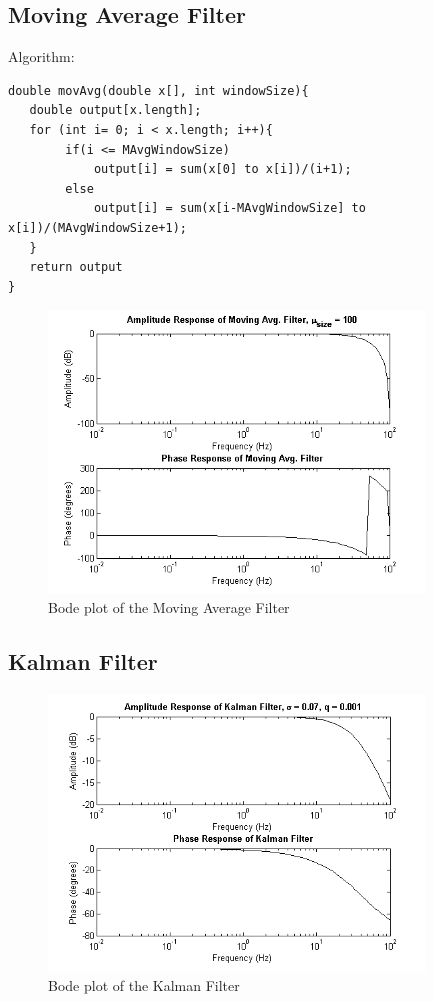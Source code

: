 \documentclass{article}
\theoremstyle{plain}
\theoremstyle{definition}
\theoremstyle{remark}
\begin{document}
\clearpage



\subsection{Moving Average Filter}
Algorithm:
\begin{verbatim}
double movAvg(double x[], int windowSize){
   double output[x.length];   
   for (int i= 0; i < x.length; i++){
        if(i <= MAvgWindowSize)
            output[i] = sum(x[0] to x[i])/(i+1);
        else
            output[i] = sum(x[i-MAvgWindowSize] to x[i])/(MAvgWindowSize+1);
   }
   return output
}
\end{verbatim}

\begin{figure}[hbt]
\begin{center}
\includegraphics[width = 10cm]{bode_MAvgF}
\caption{Bode plot of the Moving Average Filter}
\label{bode_MAvgF}
\end{center}
\end{figure}
 
\clearpage

\subsection{Kalman Filter}

\begin{figure}[hbt]
\begin{center}
\includegraphics[width = 10cm]{bode_KF}
\caption{Bode plot of the Kalman Filter}
\label{bode_KF}
\end{center}
\end{figure}
\end{document}
